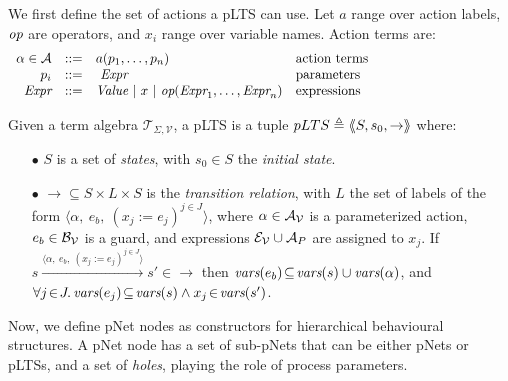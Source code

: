 \documentclass{lncs/llncs}
\newcommand{\noteSB}[2][color=green!40, size=\tiny]{\todo[#1]{{\bf
      Note: } {#2}}}
\newcommand{\cT}{\ensuremath{\mathcal{T}}}
\newcommand{\cV}{\ensuremath{\mathcal{V}}}
\newcommand{\signature}{\ensuremath{\Sigma}}
\newcommand{\variables}{\ensuremath{\cV}}
\newcommand{\Talg}{\ensuremath{\cT_{\signature,\variables}}}
\def\AlgE{\mathcal{E}}
\def\AlgA{\mathcal{A}}
\def\AlgB{\mathcal{B}}
\begin{document}
We first define the set of actions a pLTS can use.  Let $a$
range over action labels, $\symb{op}$ are operators, and $x_i$ range over
variable names. Action terms are:
\[
\begin{array}[l]{rcl@{\quad}p{5.5cm}}
  \alpha\in\AlgA&::=&a(p_1,\ldots,p_n)&\text{action terms}\\
  p_i&::=& ~\symb{Expr}&\text{parameters}\\
  \symb{Expr}&::=& \symb{Value}~|~x~|~\symb{op}(\symb{Expr}_1,\dots,\symb{Expr}_n)&\text{expressions}
\end{array}
\]

\begin{definition}[pLTS]
\label{pLTS}
Given a term algebra $\Talg$, a pLTS is a tuple
$pLTS\triangleq\langle\hspace{-0.58ex}\langle S,s_0, \to\rangle\hspace{-0.58ex}\rangle$ where:
\begin{itemize}
\item[$\bullet$]
$S$ is a set of \emph{states}, with $s_0 \in S$ the \emph{initial state}.
\item[$\bullet$] $\to \subseteq S \times L \times S$ is the \emph{transition relation}, with
$L$ the set of labels of the form
$\langle \alpha,~e_b,~(x_j\!:= {e}_j)^{j\in J}\rangle$,
  where $\alpha \in\AlgA_{\P}$ is a parameterized action,
    $e_b \in \AlgB_{\P}$ is a guard, and
    expressions  $\AlgE_{\P}\cup\AlgA_{P}$ are assigned to $x_j$.
If 
$s \xrightarrow{\langle \alpha,~e_b,~(x_j\!:= {e}_j)^{j\in
		J}\rangle} s'\in \to $ then 
                $\vars(e_b)\!\subseteq\! \vars(s)\cup\vars(\alpha)$, and
		$\forall j\!\in\! J .\,\vars(e_j)\!\subseteq\! \vars(s)\land 
x_j\!\in\!\vars(s')$.
\end{itemize}
\end{definition}

Now, we define
pNet nodes as constructors for hierarchical behavioural structures.
A pNet node has a set of sub-pNets that can be either pNets or pLTSs, and a
set of \emph{holes}, playing the role of process parameters.
\end{document}
